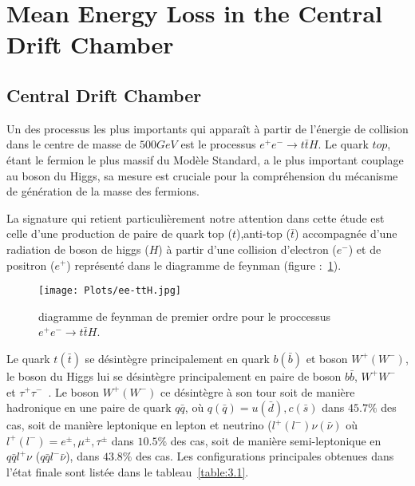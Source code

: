 \section{Mean Energy Loss in the Central Drift Chamber}
\label{p3}

\subsection{Central Drift Chamber}

Un des processus les plus importants qui appara\^it \`a partir de l'\'energie de collision dans le centre de masse de $500GeV$ est le processus $e^{+}e^{-}{\rightarrow}t\bar{t}H$. Le quark $top$, \'etant le fermion le plus massif du Mod\`ele Standard, a le plus important couplage au boson du Higgs, sa mesure est cruciale pour la compr\'ehension du m\'ecanisme de g\'en\'eration de la masse des fermions.
~\par La signature qui retient particuli\`erement notre attention dans cette \'etude est celle d'une production de paire de quark top ($t$),anti-top ($\bar{t}$) accompagnée d'une radiation de boson de higgs ($H$) \`a partir d'une collision d'electron ($e^{-}$) et de positron ($e^{+}$) représenté dans le diagramme de feynman (figure :~\ref{figure:3.1}).

\begin{figure}[H]
\centering
\texttt{[image: Plots/ee-ttH.jpg]}
\caption{diagramme de feynman de premier ordre pour le proccessus $e^{+}e^{-}{\rightarrow}t\bar{t}H$.}
\label{figure:3.1}
\end{figure}

Le quark $t(\bar{t})$ se d\'esint\`egre principalement en quark $b(\bar{b})$ et boson $W^+(W^-)$, le boson du Higgs lui se d\'esint\`egre principalement en paire de boson $b\bar{b}$, $W^+W^-$ et $\tau^{+} \tau^{-}$~\cite{1}. Le boson $W^+(W^-)$ ce d\'esint\`egre \`a son tour soit de mani\`ere hadronique en une paire de quark $q\bar{q}$, o\`u $q(\bar{q})=u(\bar{d}),c(\bar{s})$ dans $45.7\%$ des cas, soit de mani\`ere leptonique en lepton et neutrino ($l^+(l^-)\nu(\bar{\nu})$ o\`u $l^+(l^-)=e^{\pm},\mu^{\pm},\tau^{\pm}$ dans $10.5\%$ des cas, soit de mani\`ere semi-leptonique en $q\bar{q}l^+\nu$ ($q\bar{q}l^-\bar{\nu}$), dans $43.8\%$ des cas. Les configurations principales obtenues dans l'\'etat finale sont list\'ee dans le tableau~\ref{table:3.1}.

